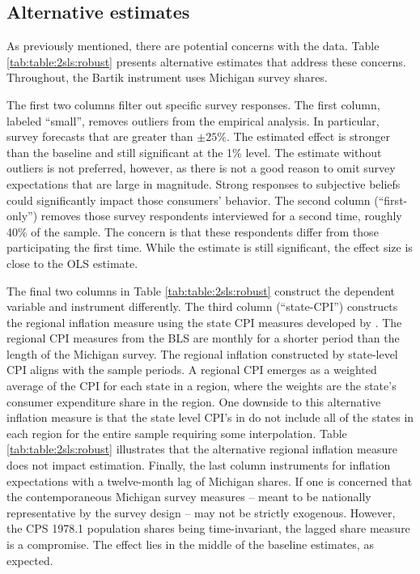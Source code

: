 \documentclass[12pt]{article}
\begin{document}


\subsection{Alternative estimates}

As previously mentioned, there are potential concerns with the data. Table \ref{tab:table:2sls:robust} presents alternative estimates that address these concerns. Throughout, the Bartik instrument uses Michigan survey shares.




The first two columns filter out specific survey responses. The first column, labeled ``small'', removes outliers from the empirical analysis. In particular, survey forecasts that are greater than $\pm 25\%$. The estimated effect is stronger than the baseline and still significant at the 1\% level. The estimate without outliers is not preferred, however, as there is not a good reason to omit survey expectations that are large in magnitude. Strong responses to subjective beliefs could significantly impact those consumers' behavior. The second column (``first-only'') removes those survey respondents interviewed for a second time, roughly 40\% of the sample. The concern is that these respondents differ from those participating the first time. While the estimate is still significant, the effect size is close to the OLS estimate.

The final two columns in Table \ref{tab:table:2sls:robust} construct the dependent variable and instrument differently. The third column (``state-CPI'') constructs the regional inflation measure using the state CPI measures developed by \cite{NakamuraSteinsson:QJE2022}. The regional CPI measures from the BLS are monthly for a shorter period than the length of the Michigan survey. The regional inflation constructed by state-level CPI aligns with the sample periods. A regional CPI emerges as a weighted average of the CPI for each state in a region, where the weights are the state's consumer expenditure share in the region. One downside to this alternative inflation measure is that the state level CPI's in \cite{NakamuraSteinsson:QJE2022} do not include all of the states in each region for the entire sample requiring some interpolation. Table \ref{tab:table:2sls:robust} illustrates that the alternative regional inflation measure does not impact estimation. Finally, the last column instruments for inflation expectations with a twelve-month lag of Michigan shares. If one is concerned that the contemporaneous Michigan survey measures -- meant to be nationally representative by the survey design -- may not be strictly exogenous. However, the CPS 1978.1 population shares being time-invariant, the lagged share measure is a compromise. The effect lies in the middle of the baseline estimates, as expected.
\end{document}

